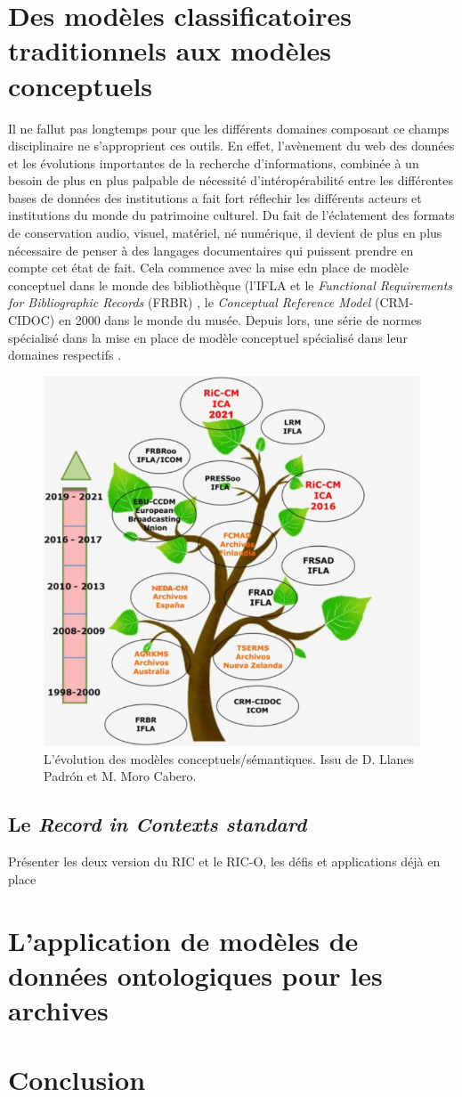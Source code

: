 \documentclass[12pt]{report}
\begin{document}
\section{Des modèles classificatoires traditionnels aux modèles conceptuels}
Il ne fallut pas longtemps pour que les différents domaines composant ce champs disciplinaire ne s'approprient ces outils. En effet, l'avènement du web des données et les évolutions importantes de la recherche d'informations, combinée à un besoin de plus en plus palpable de nécessité d'intéropérabilité entre les différentes bases de données des institutions a fait fort réflechir les différents acteurs et institutions du monde du patrimoine culturel. Du fait de l'éclatement des formats de conservation audio, visuel, matériel, né numérique, il devient de plus en plus nécessaire de penser à des langages documentaires qui puissent prendre en compte cet état de fait. 
Cela commence avec la mise edn place de modèle conceptuel dans le monde des bibliothèque (l'IFLA et le \textit{Functional Requirements for Bibliographic Records} (FRBR)\autocite{IFLA1997Functional} , le \textit{Conceptual Reference Model} (CRM-CIDOC) en 2000 dans le monde du musée. Depuis lors, une série de normes spécialisé dans la mise en place de modèle conceptuel spécialisé dans leur domaines respectifs\autocite{Koch2021Moving, LlanesPadron2023RiC-CM} . 
\begin{figure}[h]
    \centering
    \includegraphics[scale = 0.4]{evolution_CM.png}
    \caption {L'évolution des modèles conceptuels/sémantiques. Issu de D. Llanes Padrón et M. Moro Cabero.}
    \label{fig:enter-label}
\end{figure}
\newline
\subsection{Le \textit{Record in Contexts standard}}
Présenter les deux version du RIC et le RIC-O, les défis et applications déjà en place
\section{L'application de modèles de données ontologiques pour les archives}
\section{Conclusion}
\end{document}
